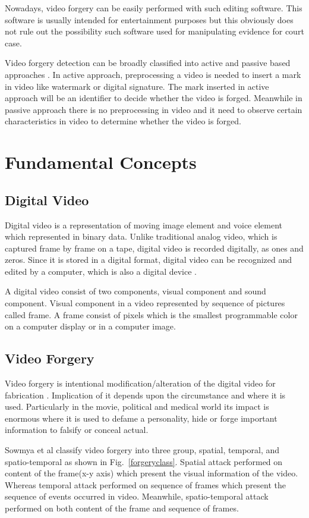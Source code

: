 \documentclass[conference]{IEEEtran}
\begin{document}
Nowadays, video forgery can be easily performed with such editing software. This software is usually intended for entertainment purposes but this obviously does not rule out the possibility such software used for manipulating evidence for court case.

Video forgery detection can be broadly classified into active and passive based approaches \cite{b1}. In active approach, preprocessing a video is needed to insert a mark in video like watermark or digital signature. The mark inserted in active approach will be an identifier to decide whether the video is forged. Meanwhile in passive approach there is no preprocessing in video and it need to observe certain characteristics in video to determine whether the video is forged.

\section{Fundamental Concepts}
\subsection{Digital Video}
Digital video is a representation of moving image element and voice element which represented in binary data. Unlike traditional analog video, which is captured frame by frame on a tape, digital video is recorded digitally, as ones and zeros. Since it is stored in a digital format, digital video can be recognized and edited by a computer, which is also a digital device \cite{b3}.

A digital video consist of two components, visual component and sound component. Visual component in a video represented by sequence of pictures called frame. A frame consist of pixels which is the smallest programmable color on a computer display or in a computer image.

\subsection{Video Forgery}
Video forgery is intentional modification/alteration of the digital video for fabrication \cite{b1}. Implication of it depends upon the circumstance and where it is used. Particularly in the movie, political and medical world its impact is enormous where it is used to defame a personality, hide or forge important information to falsify or conceal actual.

Sowmya et al \cite{b1} classify video forgery into three group, spatial, temporal, and spatio-temporal as shown in Fig.~\ref{forgeryclass}. Spatial attack performed on content of the frame(x-y axis) which present the visual information of the video. Whereas temporal attack performed on sequence of frames which present the sequence of events occurred in video. Meanwhile, spatio-temporal attack performed on both content of the frame and sequence of frames.
\end{document}
